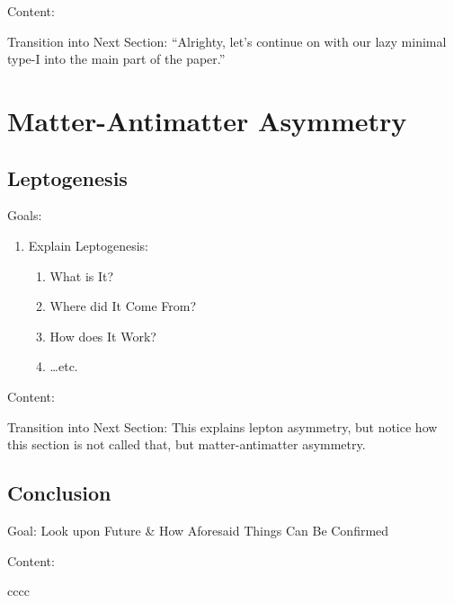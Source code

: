 \documentclass[a4paper,12pt]{article}
\begin{document}
Content:

Transition into Next Section: “Alrighty, let’s continue on with our lazy minimal type-I into the main part of the paper.”


\section{Matter-Antimatter Asymmetry}

\subsection{Leptogenesis}

Goals:
\begin{enumerate}
	\item Explain Leptogenesis:
	\begin{enumerate}
		\item What is It?
		\item Where did It Come From?
		\item How does It Work?
		\item …etc.
	\end{enumerate}
\end{enumerate}

Content:

Transition into Next Section: This explains lepton asymmetry, but notice how this section is not called that, but matter-antimatter asymmetry.

\subsection{Conclusion}

Goal: Look upon Future \& How Aforesaid Things Can Be Confirmed

Content:

cccc \cite{author2023book}

\newpage

\end{document}
